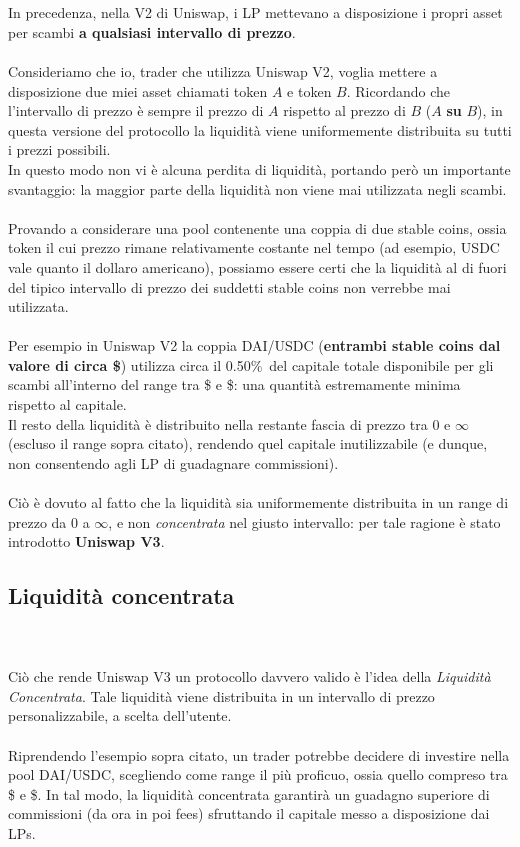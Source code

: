 \documentclass[12pt,a4paper]{report}
\begin{document}
\\\\In precedenza, nella V2 di Uniswap, i LP mettevano a disposizione i propri asset per scambi \textbf{a qualsiasi intervallo di prezzo}.
\\\\Consideriamo che io, trader che utilizza Uniswap V2, voglia mettere a disposizione due miei asset chiamati token $A$ e token $B$.
Ricordando che l'intervallo di prezzo è sempre il prezzo di $A$ rispetto al prezzo di $B$ ($A$ \textbf{su} $B$), in questa versione del protocollo la liquidità viene uniformemente distribuita su tutti i prezzi possibili.
\\In questo modo non vi è alcuna perdita di liquidità, portando però un importante svantaggio: la maggior parte della liquidità non viene mai utilizzata negli scambi.
\\\\Provando a considerare una pool contenente una coppia di due stable coins, ossia token il cui prezzo rimane relativamente costante nel tempo (ad esempio, USDC vale quanto il dollaro americano), possiamo essere certi che la liquidità al di fuori del tipico intervallo di prezzo dei suddetti stable coins non verrebbe mai utilizzata.
\\\\Per esempio in Uniswap V2 la coppia DAI/USDC (\textbf{entrambi stable coins dal valore di circa \$}) utilizza circa il 0.50\%\ del capitale totale disponibile per gli scambi all'interno del range tra \$ e \$\cite{v2_waste}: una quantità estremamente minima rispetto al capitale.\\Il resto della liquidità è distribuito nella restante fascia di prezzo tra 0 e $\infty$ (escluso il range sopra citato), rendendo quel capitale inutilizzabile (e dunque, non consentendo agli LP di guadagnare commissioni). 
\\\\Ciò è dovuto al fatto che la liquidità sia uniformemente distribuita in un range di prezzo da 0 a $\infty$, e non \textit{concentrata} nel giusto intervallo: per tale ragione è stato introdotto \textbf{Uniswap V3}.

\subsection{Liquidità concentrata}
\\\\Ciò che rende Uniswap V3 un protocollo davvero valido è l'idea della \textit{Liquidità Concentrata}\cite{concentrated_liquidity}. Tale liquidità viene distribuita in un intervallo di prezzo personalizzabile, a scelta dell'utente.
\\\\Riprendendo l'esempio sopra citato, un trader potrebbe decidere di investire nella pool DAI/USDC, scegliendo come range il più proficuo, ossia quello compreso tra \$ e \$.
In tal modo, la liquidità concentrata garantirà un guadagno superiore di commissioni (da ora in poi fees) sfruttando il capitale messo a disposizione dai LPs.
\end{document}
